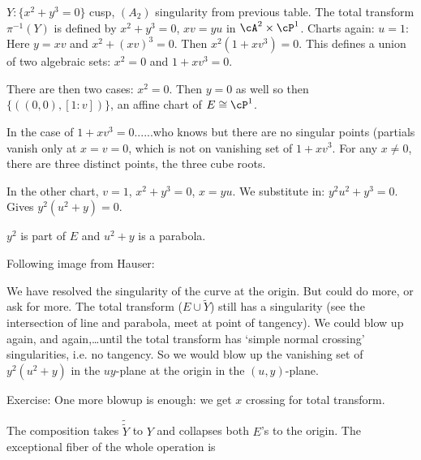 \begin{ex}
$Y: \{x^2+y^3=0\}$ cusp, $(A_2)$ singularity from previous table. The total transform $\pi^{-1}(Y)$ is defined by $x^2+y^3=0$, $xv=yu$ in $\cA^2 \times \cP^1$. Charts again: $u=1$: Here $y=xv$ and $x^2+(xv)^3=0$. Then $x^2(1+xv^3)=0$. This defines a union of two algebraic sets: $x^2=0$ and $1+xv^3=0$. 

There are then two cases: $x^2=0$. Then $y=0$ as well so then $\{((0,0), [1:v])\}$, an affine chart of $E \cong \cP^1$. 

In the case of $1+xv^3=0$......who knows but there are no singular points (partials vanish only at $x=v=0$, which is not on vanishing set of $1+xv^3$. For any $x \neq 0$, there are three distinct points, the three cube roots. 

In the other chart, $v=1$, $x^2+y^3=0$, $x=yu$. We substitute in: $y^2u^2+y^3=0$. Gives $y^2(u^2+y)=0$. 

$y^2$ is part of $E$ and $u^2+y$ is a parabola. 


Following image from Hauser:


We have resolved the singularity of the curve at the origin. But could do more, or ask for more. The total transform ($E \cup \tilde{Y}$) still has a singularity (see the intersection of line and parabola, meet at point of tangency). We could blow up again, and again,\dots until the total transform has `simple normal crossing' singularities, i.e. no tangency. So we would blow up the vanishing set of $y^2(u^2+y)$ in the $uy$-plane at the origin in the $(u,y)$-plane.
\end{ex}

Exercise: One more blowup is enough: we get $x$ crossing for total transform.


The composition takes $\tilde{\tilde{Y}}$ to $Y$ and collapses both $E$'s to the origin. The exceptional fiber of the whole operation is


